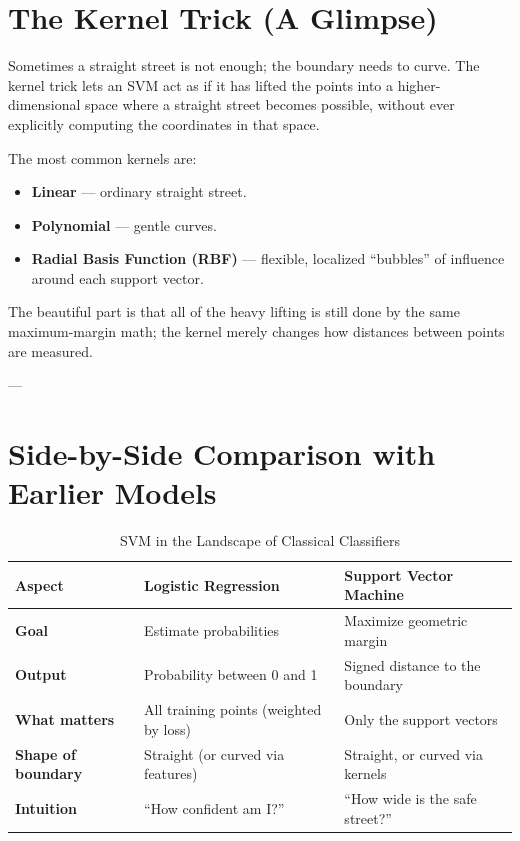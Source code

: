 \documentclass[11pt,journal,onecolumn]{IEEEtran}
\begin{document}
\section{The Kernel Trick (A Glimpse)}
\label{sec:kernel}

Sometimes a straight street is not enough; the boundary needs to curve. The kernel trick lets an SVM act as if it has lifted the points into a higher-dimensional space where a straight street becomes possible, without ever explicitly computing the coordinates in that space.

The most common kernels are:
\begin{itemize}
    \item \textbf{Linear} --- ordinary straight street.
    \item \textbf{Polynomial} --- gentle curves.
    \item \textbf{Radial Basis Function (RBF)} --- flexible, localized “bubbles” of influence around each support vector.
\end{itemize}

The beautiful part is that all of the heavy lifting is still done by the same maximum-margin math; the kernel merely changes how distances between points are measured.

\vspace{0.3em}
\noindent{}
\vspace{0.3em}

---

\section{Side-by-Side Comparison with Earlier Models}
\label{sec:comparison}

\begin{table}[htbp]
\centering
\caption{SVM in the Landscape of Classical Classifiers}
\label{tab:svm_comparison}
\begin{tabular}{@{}lll@{}}
\toprule
\textbf{Aspect} & \textbf{Logistic Regression} & \textbf{Support Vector Machine} \\
\midrule
\textbf{Goal} & Estimate probabilities & Maximize geometric margin \\
\textbf{Output} & Probability between 0 and 1 & Signed distance to the boundary \\
\textbf{What matters} & All training points (weighted by loss) & Only the support vectors \\
\textbf{Shape of boundary} & Straight (or curved via features) & Straight, or curved via kernels \\
\textbf{Intuition} & “How confident am I?” & “How wide is the safe street?” \\
\bottomrule
\end{tabular}
\end{table}
\end{document}
